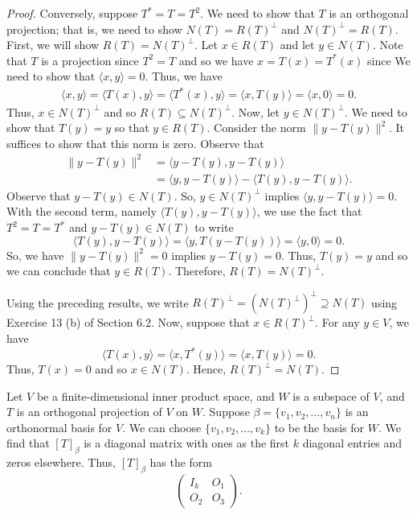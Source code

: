 \begin{proof}
Conversely, suppose \( T^{*} = T = T^{2} \). We need to show that \( T  \) is an orthogonal projection; that is, we need to show \( N(T) = R(T)^{\perp} \) and \( N(T)^{\perp} = R(T) \). First, we will show \( R(T) = N(T)^{\perp} \). Let \( x \in R(T)  \) and let \( y \in N(T) \). Note that \( T  \) is a projection since \( T^{2} = T  \) and so we have \( x = T(x) = T^{*}(x) \) since  We need to show that \( \langle x , y \rangle = 0  \). Thus, we have 
\begin{align*}
    \langle x  , y \rangle = \langle  T(x) ,  y  \rangle
                           =\langle T^{*}(x) , y  \rangle 
                           = \langle x  , T(y) \rangle  
                           = \langle x , 0  \rangle 
                           = 0.
\end{align*}
Thus, \( x \in N(T)^{\perp} \) and so \( R(T) \subseteq N(T)^{\perp} \). Now, let \( y \in N(T)^{\perp} \). We need to show that \( T(y) = y  \) so that \( y \in R(T) \). Consider the norm \( \| y - T(y)\|^{2}  \). It suffices to show that this norm is zero. Observe that
\begin{align*}
    \|y - T(y)\|^{2} &= \langle y - T(y) , y - T(y) \rangle \\
                     &= \langle y  , y - T(y) \rangle - \langle T(y) , y - T(y) \rangle.
\end{align*}
Observe that \( y - T(y) \in N(T) \). So, \( y \in N(T)^{\perp} \) implies \( \langle y  ,  y - T(y) \rangle = 0   \). With the second term, namely \( \langle T(y) , y - T(y) \rangle \), we use the fact that \( T^{2} = T = T^{*}  \) and \( y - T(y) \in N(T) \) to write
\[ \langle T(y) , y - T(y) \rangle = \langle y  ,  T(y - T(y)) \rangle = \langle y  , 0 \rangle = 0.    \]
So, we have \( \|y - T(y)\|^{2} = 0  \) implies \( y - T(y) = 0  \). Thus, \(  T(y) = y  \) and so we can conclude that \( y \in R(T) \). Therefore, \( R(T) = N(T)^{\perp} \).

Using the preceding results, we write \( R(T)^{\perp} = (N(T)^{\perp})^{\perp}  \supseteq  N(T)\) using Exercise 13 (b) of Section 6.2. Now, suppose that \( x \in R(T)^{\perp} \). For any \( y \in V  \), we have 
\[  \langle T(x) , y  \rangle = \langle x  , T^{*}(y) \rangle = \langle x  , T(y) \rangle = 0.  \]
Thus, \( T(x) = 0  \) and so \( x \in N(T) \). Hence, \( R(T)^{\perp} = N(T) \).
\end{proof}

Let \( V  \) be a finite-dimensional inner product space, and \( W  \) is a subspace of \( V  \), and \( T \) is an orthogonal projection of \( V  \) on \( W  \). Suppose \( \beta = \{ {v}_{1}, {v}_{2}, \dots, {v}_{n } \}   \) is an orthonormal basis for \( V  \). We can choose \( \{ {v}_{1}, {v}_{2}, \dots, {v}_{k} \}   \) to be the basis for \( W  \). We find that \( [T]_{\beta} \) is a diagonal matrix with ones as the first \(  k  \) diagonal entries and zeros elsewhere. Thus, \( [T]_{\beta} \) has the form  
\[  \begin{pmatrix}
    {I}_{k} & {O}_{1} \\
    {O}_{2} & {O}_{3}
\end{pmatrix}. \]

